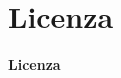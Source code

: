 \documentclass[hidelinks,aspectratio=169]{beamer}
\begin{document}
\section{\textbf{Licenza}}
\begin{frame}{\textbf{Licenza}}
	\begin{center}
		\doclicenseThis
	\end{center}
\end{frame}
	
	
\end{document}
